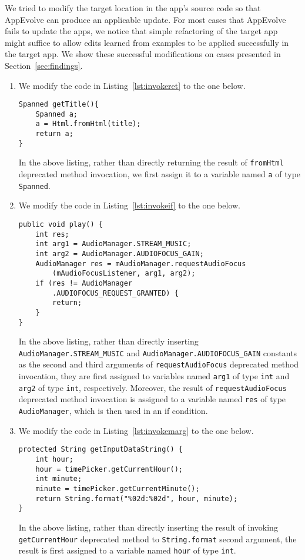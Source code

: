 We tried to modify the target location in the app's source code so that AppEvolve can produce an applicable update. For most cases that AppEvolve fails to update the apps, we notice that simple refactoring of the target app might suffice to allow edits learned from examples to be applied successfully in the target app. We show these successful modifications on cases presented in Section~\ref{sec:findings}.
\begin{enumerate}
\item We modify the code in Listing~\ref{lst:invokeret} to the one below.
\begin{lstlisting}[language=text,numbers=none]
Spanned getTitle(){
    Spanned a;
    a = Html.fromHtml(title);
    return a;
}
\end{lstlisting}
In the above listing, rather than directly returning the result of {\tt fromHtml} deprecated method invocation, we first assign it to a variable named {\tt a} of type {\tt Spanned}. %

\item We modify the code in Listing~\ref{lst:invokeif} to the one below.
\begin{lstlisting}[language=text,numbers=none]
public void play() {
    int res;
    int arg1 = AudioManager.STREAM_MUSIC;
    int arg2 = AudioManager.AUDIOFOCUS_GAIN;
    AudioManager res = mAudioManager.requestAudioFocus
        (mAudioFocusListener, arg1, arg2);
    if (res != AudioManager
        .AUDIOFOCUS_REQUEST_GRANTED) {
        return;
    }
}
\end{lstlisting}
In the above listing, rather than directly inserting {\tt AudioManager.STREAM\_MUSIC} and {\tt AudioManager.AUDIOFOCUS\_GAIN} constants as the second and third arguments of {\tt requestAudioFocus} deprecated method invocation, they are first assigned to variables named {\tt arg1} of type {\tt int} and {\tt arg2} of type {\tt int}, respectively. Moreover, the result of {\tt requestAudioFocus} deprecated method invocation is assigned to a variable  named {\tt res} of type {\tt AudioManager}, which is then used in an if condition.

\item We modify the code in Listing~\ref{lst:invokemarg} to the one below.
\begin{lstlisting}[language=text,numbers=none]
protected String getInputDataString() {
    int hour;
    hour = timePicker.getCurrentHour();
    int minute;
    minute = timePicker.getCurrentMinute();
    return String.format("%02d:%02d", hour, minute);
}
\end{lstlisting}
In the above listing, rather than directly inserting the result of invoking {\tt getCurrentHour} deprecated method to {\tt String.format} second argument, the result is first assigned to a variable named {\tt hour} of type {\tt int}.


\end{enumerate}
